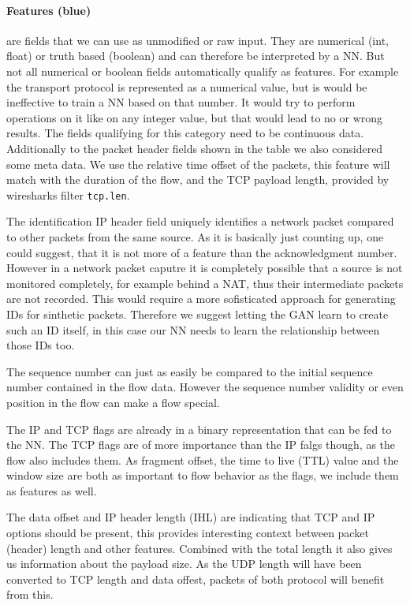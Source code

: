 \documentclass[
	ngerman,
	ruledheaders=section,%
	class=report,%
	thesis={type=bachelor},%
	accentcolor=9c,%
	custommargins=true,%
	marginpar=false,%
	parskip=half-,%
	fontsize=11pt,%
]{tudapub}
\let\code\texttt
\begin{document}
\paragraph{\colorbox{feature}{\textbf{Features} (blue)}} are fields that we can use as unmodified or raw input.
They are numerical (int, float) or truth based (boolean) and can therefore be interpreted by a NN.
But not all numerical or boolean fields automatically qualify as features.
For example the transport protocol is represented as a numerical value, but is would be ineffective to train a NN based on that number.
It would try to perform operations on it like on any integer value, but that would lead to no or wrong results.
The fields qualifying for this category need to be continuous data.
Additionally to the packet header fields shown in the table we also considered some meta data.
We use the relative time offset of the packets, this feature will match with the duration of the flow,
and the TCP payload length, provided by wiresharks filter \code{tcp.len}.

The identification IP header field uniquely identifies a network packet compared to other packets from the same source.
As it is basically just counting up, one could suggest, that it is not more of a feature than the acknowledgment number.
However in a network packet caputre it is completely possible that a source is not monitored completely, for example behind a NAT,
thus their intermediate packets are not recorded.
This would require a more sofisticated approach for generating IDs for sinthetic packets.
Therefore we suggest letting the GAN learn to create such an ID itself, in this case our NN needs to learn the relationship between those IDs too.

The sequence number can just as easily be compared to the initial sequence number contained in the flow data.
However the sequence number validity or even position in the flow can make a flow special.

The IP and TCP flags are already in a binary representation that can be fed to the NN.
The TCP flags are of more importance than the IP falgs though, as the flow also includes them.
As fragment offset, the time to live (TTL) value and the window size are both as important to flow behavior as the flags, we include them as features as well.

The data offset and IP header length (IHL) are indicating that TCP and IP options should be present, this provides interesting context between packet (header) length and other features.
Combined with the total length it also gives us information about the payload size.
As the UDP length will have been converted to TCP length and data offest, packets of both protocol will benefit from this.
\end{document}
